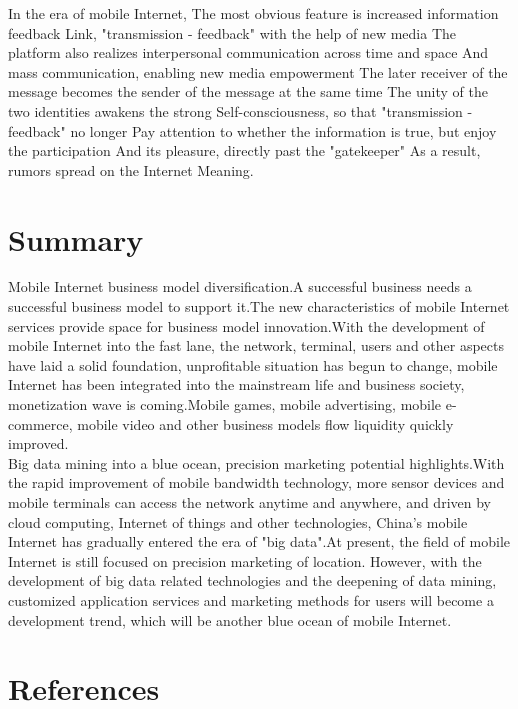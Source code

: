 \documentclass{elsarticle}
\begin{document}
In the era of mobile Internet,
The most obvious feature is increased information feedback
Link, "transmission - feedback" with the help of new media
The platform also realizes interpersonal communication across time and space
And mass communication, enabling new media empowerment
The later receiver of the message becomes the sender of the message at the same time\cite{zw10}
The unity of the two identities awakens the strong
Self-consciousness, so that "transmission - feedback" no longer
Pay attention to whether the information is true, but enjoy the participation
And its pleasure, directly past the "gatekeeper"
As a result, rumors spread on the Internet
Meaning.



\section{Summary}\label{sec:summary}
Mobile Internet business model diversification.A successful business needs a successful business model to support it.The new characteristics of mobile Internet services provide space for business model innovation.With the development of mobile Internet into the fast lane, the network, terminal, users and other aspects have laid a solid foundation, unprofitable situation has begun to change, mobile Internet has been integrated into the mainstream life and business society, monetization wave is coming.Mobile games, mobile advertising, mobile e-commerce, mobile video and other business models flow liquidity quickly improved.\\

Big data mining into a blue ocean, precision marketing potential highlights.With the rapid improvement of mobile bandwidth technology, more sensor devices and mobile terminals can access the network anytime and anywhere, and driven by cloud computing, Internet of things and other technologies, China's mobile Internet has gradually entered the era of "big data".At present, the field of mobile Internet is still focused on precision marketing of location. However, with the development of big data related technologies and the deepening of data mining, customized application services and marketing methods for users will become a development trend, which will be another blue ocean of mobile Internet.

\section*{References}

\small
\nocite{*}

%
%
	
\end{document}
